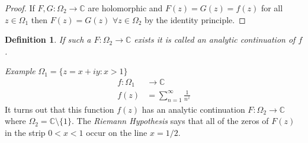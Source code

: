 \documentclass[a4paper, 11pt]{article}
\newtheorem*{definition}{Definition}
\begin{document}
	\begin{proof}
		If $F,G:\Omega_2\to\mathbb{C}$ are holomorphic and $F(z)=G(z) = f(z)$ for all $z\in \Omega_1$ then $F(z)=G(z)$ $\forall z\in\Omega_2$ by the identity principle. 
	\end{proof}

	\begin{definition}
		If such a $F:\Omega_2\to\mathbb{C}$ exists it is called an \textit{analytic continuation} of  $f$. 
	\end{definition}

	\noindent \textit{Example} $\Omega_1 = \{z=x+iy : x>1\}$
		\begin{align*}
			f:\Omega_1&\to \mathbb{C} \\ 
			f(z) &= \sum\limits_{n=1}^\infty \frac{1}{n^z}
		\end{align*} 
	It turns out that this function $f(z)$ has an analytic continuation $F:\Omega_2\to\mathbb{C}$ where $\Omega_2 = \mathbb{C}\setminus\{1\}$. The \textit{Riemann Hypothesis} says that all of the zeros of $F(z)$ in the strip $0<x<1$ occur on the line $x=1/2$. 

	
\end{document}
